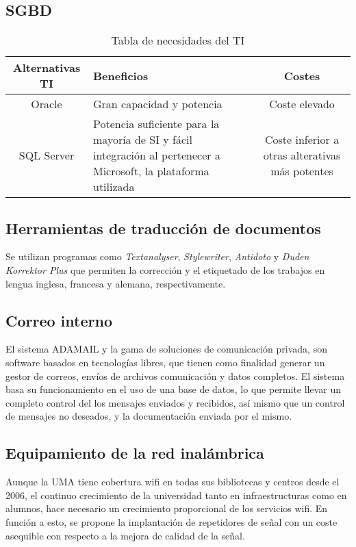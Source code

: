 \documentclass[11pt,a4paper,spanish,twoside]{book}
\begin{document}
\begin{itemize}
\subsection{SGBD}

\begin{table}[!h]
\centering
  \begin{tabular}{clc}
    \textbf{Alternativas TI} & \textbf{Beneficios} &
    \textbf{Costes} \\ \hline 
    \hline \hline
    Oracle\cite{ora} & Gran capacidad y potencia & Coste elevado\\
    SQL Server\cite{sql} & Potencia suficiente para la mayoría de SI y fácil
    integración al pertenecer a Microsoft, la plataforma utilizada & Coste
    inferior a otras alterativas más potentes\\
  \end{tabular}
\caption{Tabla de necesidades del TI}
\end{table}

\subsection{Herramientas de traducción de documentos}
Se utilizan programas como \emph{Textanalyser}, \emph{Stylewriter},
\emph{Antidoto} y \emph{Duden Korrektor Plus} que permiten la corrección y el
etiquetado de los trabajos en lengua inglesa, francesa y alemana,
respectivamente\cite{tra}. 

\subsection{Correo interno}
El sistema ADAMAIL\cite{ada} y la gama de soluciones de comunicación privada,
son software basados en tecnologías libres, que tienen como finalidad generar un
gestor de correos, envíos de archivos comunicación y datos completos. El
sistema basa su funcionamiento en el uso de una base de datos, lo que permite
llevar un completo control del los mensajes enviados y recibidos, así mismo
que un control de mensajes no deseados, y la documentación enviada por el
mismo. 

\subsection{Equipamiento de la red inalámbrica}
Aunque la UMA tiene cobertura wifi en todas sus bibliotecas y centros desde
el 2006, el continuo crecimiento de la universidad tanto en infraestructuras
como en alumnos, hace necesario un crecimiento proporcional de los servicios
wifi. En función a esto, se propone la implantación de repetidores de señal
con un coste asequible con respecto a la mejora de calidad de la señal.



\end{itemize}
\end{document}
